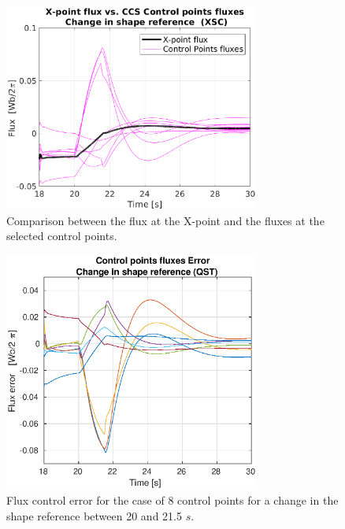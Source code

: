\begin{figure}
	\begin{center}
		\includegraphics[width=0.75\textwidth]{Chp3/8_gaosXpointVSpoinsFlux_sqzd.eps}
	\end{center}	
	\caption{Comparison between the flux at the X-point and the fluxes at the selected control points. }
	\label{FluxesSqzd}
\end{figure}


\begin{figure}
	\begin{center}
		\includegraphics[width=0.75\textwidth]{Chp3/8_gaps_fluxesError_sqzd.eps}
	\end{center}	
	\caption{ Flux control error for the case of 8 control points for a change in the shape reference  between 20 and 21.5 $s $.}
	\label{errorFluxessqzd}
\end{figure}

